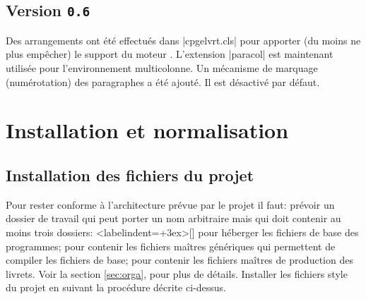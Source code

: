 \documentclass[other,11pt,fonts,openany]{cpgelvrt}
\let\FILE\file
\renewcommand\file[1]{{\color{fs}\FILE{#1}}}
\begin{document}
\subsection*{Version \texttt{0.6}}
Des arrangements ont \'et\'e effectu\'es dans |cpgelvrt.cls| pour apporter (du moins ne plus empêcher) le  support du moteur \LuaTeX{}. L'extension |paracol| est maintenant utilis\'ee pour l'environnement multicolonne. Un m\'ecanisme de marquage (num\'erotation) des paragraphes a \'et\'e ajout\'e. Il est d\'esactiv\'e par d\'efaut.

\section{Installation et normalisation}

\subsection{Installation des fichiers du projet}
Pour rester conforme à l'architecture prévue par le projet il faut:
\pcit prévoir un dossier de travail qui peut porter un nom arbitraire mais qui doit contenir au moins trois dossiers:  
\pcit<labelindent=\leftmargin+3ex>[] 
pour héberger les fichiers de base des programmes; 
\pcit[\file{Generic}] pour contenir les fichiers maîtres génériques qui permettent de compiler les fichiers de base;
\pcit[\file{Masters}] pour contenir les fichiers maîtres de production des livrets. 
\pcclose 
Voir la section \ref{sec:orga},  pour plus de détails.
\pcit Installer les fichiers style du projet en suivant la procédure décrite ci-dessus. 
\pcclose
\end{document}
